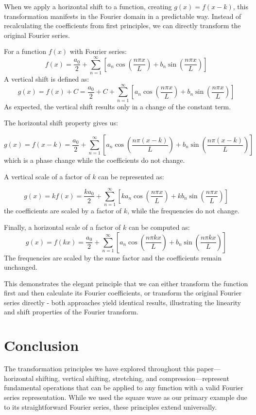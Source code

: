\documentclass{article}
\begin{document}
When we apply a horizontal shift to a function, creating $g(x) = f(x-k)$, this transformation manifests in the Fourier domain in a predictable way. Instead of recalculating the coefficients from first principles, we can directly transform the original Fourier series.

For a function $f(x)$ with Fourier series: 
$$f(x) = \frac{a_0}{2} + \sum_{n=1}^{\infty} \left[a_n \cos\left(\frac{n\pi x}{L}\right) + b_n \sin\left(\frac{n\pi x}{L}\right)\right]$$
A vertical shift is defined as:
$$g(x) = f(x)+ C = \frac{a_0}{2}+ C + \sum_{n=1}^{\infty}\left [a_n \cos\left(\frac{n\pi x}{L}\right) + b_n \sin\left(\frac{n\pi x}{L}\right)\right]$$
As expected, the vertical shift results only in a change of the constant term. 

The horizontal shift property gives us:

$$g(x) = f(x-k) = \frac{a_0}{2} + \sum_{n=1}^{\infty}\left [a_n \cos\left(\frac{n\pi (x-k)}{L}\right) + b_n \sin\left(\frac{n\pi (x-k)}{L}\right)\right]$$
which is a phase change while the coefficients do not change.

A vertical scale of a factor of $k$ can be represented as:

$$g(x) = kf(x) = \frac{ka_0}{2} + \sum_{n=1}^{\infty} \left[ ka_n \cos\left(\frac{n\pi x}{L}\right) + kb_n \sin\left(\frac{n\pi x}{L}\right) \right]$$
the coefficients are scaled by a factor of $k$, while the frequencies do not change.

Finally, a horizontal scale of a factor of $k$ can be computed as:
$$g(x) = f(kx) = \frac{a_0}{2} + \sum_{n=1}^{\infty} \left[ a_n \cos\left(\frac{n\pi kx}{L}\right) + b_n \sin\left(\frac{n\pi kx}{L}\right) \right]$$
The frequencies are scaled by the same factor and the coefficients remain unchanged. 

This demonstrates the elegant principle that we can either transform the function first and then calculate its Fourier coefficients, or transform the original Fourier series directly - both approaches yield identical results, illustrating the linearity and shift properties of the Fourier transform.

\section{Conclusion}

The transformation principles we have explored throughout this paper—horizontal shifting, vertical shifting, stretching, and compression—represent fundamental operations that can be applied to any function with a valid Fourier series representation. While we used the square wave as our primary example due to its straightforward Fourier series, these principles extend universally.\\
\end{document}
